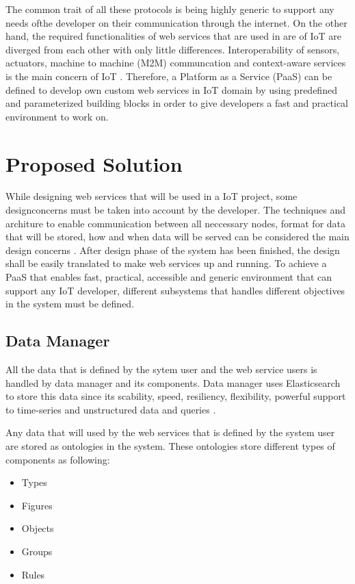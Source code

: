  The common trait of all these protocols is being highly generic to support any needs ofthe developer on their communication through the internet. On the other hand, the required functionalities of web services that are used in are of IoT are diverged from each other with only little differences. Interoperability of sensors, actuators, machine to machine (M2M) communcation and context-aware services is the main concern of IoT \cite{6651222}. Therefore, a Platform as a Service (PaaS) can be defined to develop own custom web services in IoT domain by using predefined and parameterized building blocks in order to give developers a fast and practical environment to work on.

\section{Proposed Solution}

While designing web services that will be used in a IoT project, some designconcerns must be taken into account by the developer. The techniques and architure to enable communication between all neccessary nodes, format for data that will be stored, how and when data will be served can be considered the main design concerns \cite{6651222}. After design phase of the system has been finished, the design shall be easily translated to make web services up and running. To achieve a PaaS that enables fast, practical, accessible and generic environment that can support any IoT developer, different subsystems that handles different objectives in the system must be defined.

\subsection{Data Manager}

All the data that is defined by the sytem user and the web service users is handled by data manager and its components. Data manager uses Elasticsearch to store this data since its scability, speed, resiliency, flexibility, powerful support to time-series and unstructured data and queries \cite{elastic, elastic_time}.

Any data that will used by the web services that is defined by the system user are stored as ontologies in the system. These ontologies store different types of components as following:

\begin{itemize}
  \item Types
  \item Figures
  \item Objects
  \item Groups
  \item Rules
\end{itemize}

